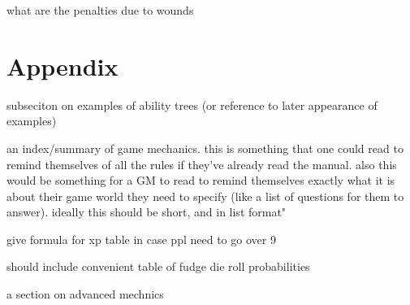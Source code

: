 \documentclass[12pt]{article}
\newcommand{\notes}[1]{{\color{Tan} #1}}
\begin{document}
\notes{what are the penalties due to wounds}

\section{Appendix}


\notes{subseciton on examples of ability trees (or reference to later appearance of examples)}

\notes{an index/summary of game mechanics. this is something that one could read to remind themselves of all the rules
if they've already read the manual. also this would be something for a GM to read to remind themselves
exactly what it is about their game world they need to specify (like a list of questions for them to answer).
ideally this should be short, and in list format"}


\notes{give formula for xp table in case ppl need to go over 9}

\notes{should include convenient table of fudge die roll probabilities}

\notes{a section on advanced mechnics}

\printindex
\end{document}

